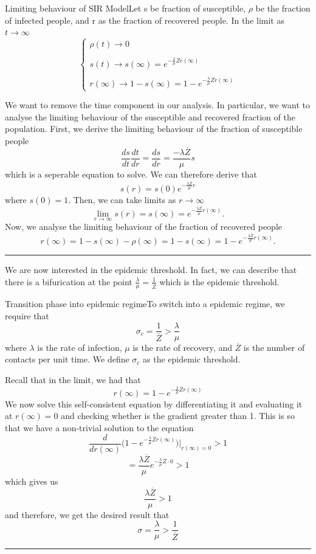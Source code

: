 \documentclass[twoside]{article}
\newenvironment{proof}{{\bf Proof:}}{\hfill\rule{2mm}{2mm}}
\begin{document}
\begin{proposition_exam}{Limiting behaviour of SIR Model}{}Let s be fraction of susceptible, $\rho$ be the fraction of infected people, and r as the fraction of recovered people. In the limit as $t \rightarrow \infty$
$$
\begin{cases}
\rho(t) \rightarrow 0 \\\\
s(t) \rightarrow s(\infty) = e^{-\frac{\lambda}{\mu}\overline{Z}r(\infty)}\\\\
r(\infty) \rightarrow 1 - s(\infty) = 1 - e^{-\frac{\lambda}{\mu}\overline{Z}r(\infty)}
\end{cases}
$$
\end{proposition_exam}

\begin{proof} We want to remove the time component in our analysis. In particular, we want to analyse the limiting behaviour of the susceptible and recovered fraction of the population. First, we derive the limiting behaviour of the fraction of susceptible people
$$
\frac{ds}{dt}\frac{dt}{dr} = \frac{ds}{dr} = \frac{-\lambda \overline{Z}}{\mu}s
$$
which is a seperable equation to solve. We can therefore derive that 
$$
s(r) = s(0)e^{-\frac{\lambda \overline{Z}}{\mu}r}
$$
where $s(0) = 1.$ Then, we can take limits as $r \rightarrow \infty$
$$
\lim_{r \rightarrow \infty}s(r) = s(\infty) = e^{-\frac{\lambda \overline{Z}}{\mu}r(\infty)}.
$$
Now, we analyse the limiting behaviour of the fraction of recovered people 
$$
r(\infty) = 1 - s(\infty) - \rho(\infty) = 1 - s(\infty) = 1 - e^{-\frac{\lambda \overline{Z}}{\mu}r(\infty)}.
$$
\end{proof}

We are now interested in the epidemic threshold. In fact, we can describe that there is a bifurication at the point $\frac{\lambda}{\mu} = \frac{1}{\overline{Z}}$ which is the epidemic threshold.
\begin{proposition_exam}{Transition phase into epidemic regime}{}To switch into a epidemic regime, we require that 
$$
\sigma_c = \frac{1}{\overline{Z}} > \frac{\lambda}{\mu}
$$
where $\lambda$ is the rate of infection, $\mu$ is the rate of recovery, and $\overline{Z}$ is the number of contacts per unit time. We define $\sigma_c$ as the epidemic threshold.
\end{proposition_exam}

\begin{proof} Recall that in the limit, we had that 
$$
r(\infty) = 1 - e^{-\frac{\lambda}{\mu}\overline{Z}r(\infty)}
$$
We now solve this self-consistent equation by differentiating it and evaluating it at $r(\infty) = 0$ and checking whether is the gradient greater than 1. This is so that we have a non-trivial solution to the equation 
$$
\frac{d}{dr(\infty)} \bigg( 1 - e^{-\frac{\lambda}{\mu}\overline{Z}r(\infty)}\bigg)\bigg|_{r(\infty) = 0} > 1
$$
$$
= \frac{\lambda \overline{Z}}{\mu}e^{-\frac{\lambda}{\mu}\overline{Z} \cdot 0} > 1
$$
which gives us 
$$
\frac{\lambda \overline{Z}}{\mu} > 1
$$
and therefore, we get the desired result that 
$$
\sigma = \frac{\lambda}{\mu} > \frac{1}{\overline{Z}}
$$
\end{proof}
\end{document}
